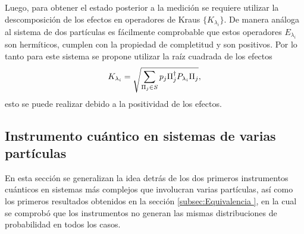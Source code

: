  Luego, para obtener el estado posterior a la medición se requiere utilizar la
descomposición de los efectos en operadores de Kraus $\{K_{\lambda_i}\}$. De
manera análoga al sistema de dos partículas es fácilmente comprobable que estos
operadores $E_{\lambda_i}$ son hermíticos, cumplen con la propiedad de
completitud y son positivos. Por lo tanto para este sistema se propone utilizar
la raíz cuadrada de los efectos 
\begin{equation}
   K_{\lambda_i}=\sqrt{\sum_{\Pi_j \in S} p_j \Pi_{j}^{\dagger}P_{\lambda_i} \Pi_{j}},
\end{equation} 
esto se puede realizar debido a la positividad de los efectos.

\subsection{Instrumento cuántico en sistemas de varias partículas}  %

En esta sección se generalizan la idea detrás de los dos primeros instrumentos
cuánticos en sistemas más complejos que involucran varias partículas, así como
los primeros resultados obtenidos en la sección {\ref{subsec:Equivalencia }},
en la cual se comprobó que los instrumentos no generan las mismas
distribuciones de probabilidad en todos los casos.

